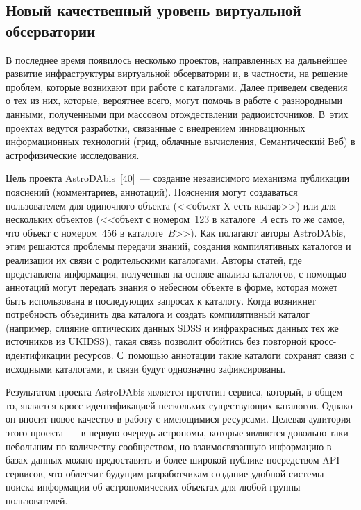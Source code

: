\begin{multicols}{2}
\subsection{Новый качественный уровень виртуальной обсерватории}

      В последнее время появилось несколько проектов, направленных на дальнейшее 
развитие инфраструктуры виртуальной обсерватории и, в част\-ности, на решение проблем, 
которые возникают при работе с каталогами. Далее приведем сведения о тех из них, которые, 
вероятнее всего, могут помочь в работе с разнородными данными, полученными при 
массовом отождествлении радиоисточников. В~этих проектах ведутся разработки, связанные 
с внедрением инновационных информационных технологий (грид, облачные вычисления, 
Семантический Веб) в астрофизические исследования.
      
      Цель проекта AstroDAbis~[40]~--- создание независимого механизма публикации 
пояснений (комментариев, аннотаций). Пояснения могут создаваться пользователем для 
одиночного объекта (<<объект X есть квазар>>) или для нескольких объектов (<<объект с 
номером~123 в каталоге~$A$ есть то же самое, что объект с номером~456 в 
каталоге~$B$>>). Как полагают авторы AstroDAbis, этим решаются проблемы передачи 
знаний, создания компилятивных каталогов и реализации их связи с родительскими 
каталогами. Авторы статей, где представлена информация, полученная на основе анализа 
каталогов, с помощью аннотаций могут передать знания о небесном объекте в форме, 
которая может быть использована в последующих запросах к каталогу. Когда возникнет 
потребность объединить два каталога и создать компилятивный каталог (например, слияние 
оптических данных SDSS и инфракрасных данных тех же источников из UKIDSS), такая 
связь позволит обойтись без повторной кросс-иден\-ти\-фи\-ка\-ции ресурсов. С~по\-мощью 
аннотации такие каталоги сохранят связи с исходными каталогами, и связи будут однозначно 
зафиксированы.
      
      Результатом проекта AstroDAbis является прототип сервиса, который, в общем-то, 
является кросс-иден\-ти\-фи\-ка\-ци\-ей нескольких существующих каталогов. Однако он вносит 
новое качество в работу с имеющимися ресурсами. Целевая аудитория этого проекта~--- в 
первую очередь астрономы, которые являются довольно-таки небольшим по количеству 
сообществом, но взаимосвязанную информацию в базах данных можно предоставить и более 
широкой публике посредством API-сер\-ви\-сов, что облегчит будущим разработчикам 
создание удобной системы поиска информации об астрономических объектах для любой 
группы пользователей.
      

\end{multicols}
